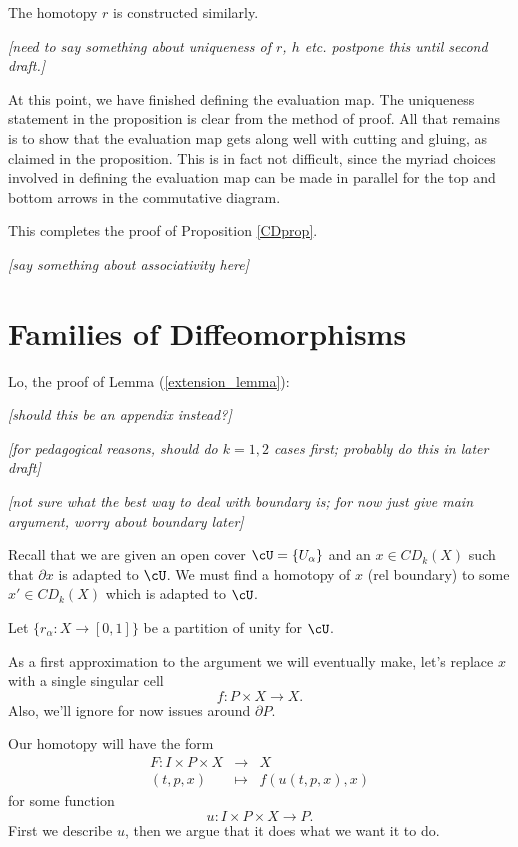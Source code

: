 \documentclass[11pt,leqno]{amsart}
\def\bd{\partial}
\def\nn#1{{{\it \small [#1]}}}
\newcommand{\eq}[1]{\begin{displaymath}#1\end{displaymath}}
\newcommand{\eqar}[1]{\begin{eqnarray*}#1\end{eqnarray*}}
\begin{document}
The homotopy $r$ is constructed similarly.

\nn{need to say something about uniqueness of $r$, $h$ etc.  
postpone this until second draft.}

At this point, we have finished defining the evaluation map.
The uniqueness statement in the proposition is clear from the method of proof.
All that remains is to show that the evaluation map gets along well with cutting and gluing,
as claimed in the proposition.
This is in fact not difficult, since the myriad choices involved in defining the
evaluation map can be made in parallel for the top and bottom
arrows in the commutative diagram.

This completes the proof of Proposition \ref{CDprop}.

\medskip

\nn{say something about associativity here}




\section{Families of Diffeomorphisms}  \label{fam_diff_sect}


Lo, the proof of Lemma (\ref{extension_lemma}):

\nn{should this be an appendix instead?}

\nn{for pedagogical reasons, should do $k=1,2$ cases first; probably do this in
later draft}

\nn{not sure what the best way to deal with boundary is; for now just give main argument, worry
about boundary later}

Recall that we are given
an open cover $\cU = \{U_\alpha\}$ and an
$x \in CD_k(X)$ such that $\bd x$ is adapted to $\cU$.
We must find a homotopy of $x$ (rel boundary) to some $x' \in CD_k(X)$ which is adapted to $\cU$.

Let $\{r_\alpha : X \to [0,1]\}$ be a partition of unity for $\cU$.

As a first approximation to the argument we will eventually make, let's replace $x$
with a single singular cell
\eq{
    f: P \times X \to X .
}
Also, we'll ignore for now issues around $\bd P$.

Our homotopy will have the form
\eqar{
    F: I \times P \times X &\to& X \\
    (t, p, x) &\mapsto& f(u(t, p, x), x)
}
for some function
\eq{
    u : I \times P \times X \to P .
}
First we describe $u$, then we argue that it does what we want it to do.
\end{document}
